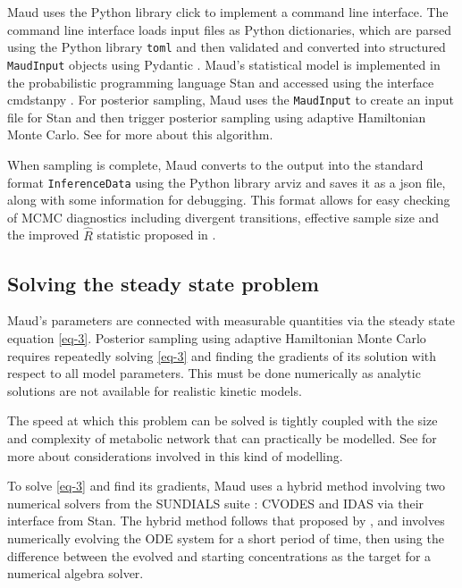 \documentclass[journal=asbcd6,manuscript=article,layout=traditional]{achemso}
\begin{document}
Maud uses the Python library click
\citep{clickdevelopersClickPythonComposable2022} to implement a command
line interface. The command line interface loads input files as Python
dictionaries, which are parsed using the Python library \texttt{toml}
\citep{pearsonTomlPythonLibrary2020} and then validated and converted
into structured \texttt{MaudInput} objects using Pydantic
\citep{pydanticdevelopersPydantic2022}. Maud's statistical model is
implemented in the probabilistic programming language Stan
\citep{carpenterStanProbabilisticProgramming2017} and accessed using the
interface cmdstanpy \citep{standevelopmentteamCmdStanPy2022}. For
posterior sampling, Maud uses the \texttt{MaudInput} to create an input
file for Stan and then trigger posterior sampling using adaptive
Hamiltonian Monte Carlo. See
\citet{betancourtConceptualIntroductionHamiltonian2018} for more about
this algorithm.

When sampling is complete, Maud converts to the output into the standard
format \texttt{InferenceData} using the Python library arviz
\citep{kumarArviZUnifiedLibrary2019} and saves it as a json file, along
with some information for debugging. This format allows for easy
checking of MCMC diagnostics including divergent transitions, effective
sample size and the improved \(\hat{R}\) statistic proposed in
\citet{vehtariRankNormalizationFoldingLocalization2021}.

\hypertarget{solving-the-steady-state-problem}{%
\subsection{Solving the steady state
problem}\label{solving-the-steady-state-problem}}

Maud's parameters are connected with measurable quantities via the
steady state equation \eqref{eq-3}. Posterior sampling using adaptive
Hamiltonian Monte Carlo requires repeatedly solving \eqref{eq-3} and
finding the gradients of its solution with respect to all model
parameters. This must be done numerically as analytic solutions are not
available for realistic kinetic models.

The speed at which this problem can be solved is tightly coupled with
the size and complexity of metabolic network that can practically be
modelled. See \citet{timonenImportanceSamplingApproach2022a} for more
about considerations involved in this kind of modelling.

To solve \eqref{eq-3} and find its gradients, Maud uses a hybrid method
involving two numerical solvers from the SUNDIALS suite
\citep{serbanCVODESSensitivityEnabledODE2005}: CVODES and IDAS via their
interface from Stan. The hybrid method follows that proposed by
\citet{margossianComputingSteadyStates2018}, and involves numerically
evolving the ODE system for a short period of time, then using the
difference between the evolved and starting concentrations as the target
for a numerical algebra solver.
\end{document}
